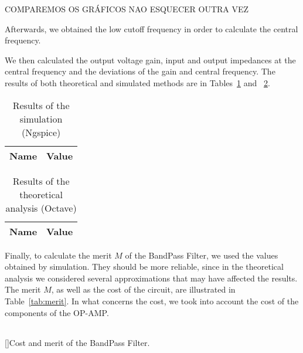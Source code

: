 COMPAREMOS OS GRÁFICOS NAO ESQUECER OUTRA VEZ

\vspace{10mm}

Afterwards, we obtained the low cutoff frequency in order to calculate the central frequency.

We then calculated the output voltage gain, input and output impedances at the central frequency and the deviations of the gain and central frequency. The results of both theoretical and simulated methods are in Tables~\ref{tab:resultsngspice} and ~\ref{tab:resultsoctave}.

\vspace{5mm}

\noindent
\begin{minipage}[c]{0.5\linewidth}

\begin{table}[H]
 \centering
 \begin{tabular}{|l|r|}
 \hline
 {\bf Name} & {\bf Value} \\ \hline
 \end{tabular}
 \caption{Results of the simulation (Ngspice)}
 \label{tab:resultsngspice}
 \end{table}
 
\end{minipage}
\begin{minipage}[c]{0.5\linewidth}

\vspace{-5mm}
 
 \begin{table}[H]
 \centering
 \begin{tabular}{|l|r|}
 \hline
 {\bf Name} & {\bf Value} \\ \hline
 \end{tabular}
 \caption{Results of the theoretical analysis (Octave)}
 \label{tab:resultsoctave}
 \end{table}
 
\end{minipage}

\vspace{10mm}

Finally, to calculate the merit $M$ of the BandPass Filter, we used the values obtained by simulation. They should be more reliable, since in the theoretical analysis we considered several approximations that may have affected the results. The merit $M$, as well as the cost of the circuit, are illustrated in Table~\ref{tab:merit}. In what concerns the cost, we took into account the cost of the components of the OP-AMP.

\vspace{2mm}

\begin{center}
\begin{tabular}{ | c | c | }\hline
\end{tabular}
[]{Cost and merit of the BandPass Filter.}
\label{tab:merit}
\end{center}

